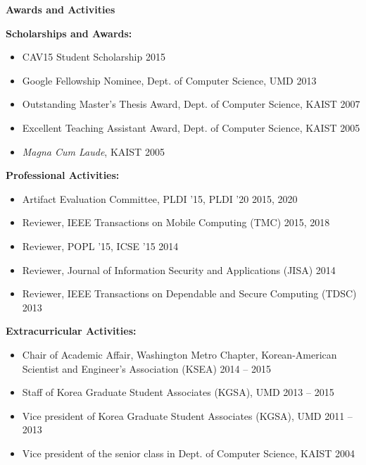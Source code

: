 \documentclass[letterpaper,11pt]{article}
\newcommand{\resheading}[1]{{\large \colorbox{mygrey}{\begin{minipage}{\textwidth}{\textbf{#1 \vphantom{p\^{E}}}}\end{minipage}}}}
\begin{document}

\resheading{Awards and Activities}
  \begin{description}
\item\textbf{Scholarships and Awards:}
\begin{itemize}
\item CAV15 Student Scholarship \hfill 2015
\item Google Fellowship Nominee, Dept. of Computer Science, UMD \hfill 2013 
\item Outstanding Master's Thesis Award, Dept. of Computer Science, KAIST \hfill 2007
\item Excellent Teaching Assistant Award, Dept. of Computer Science, KAIST \hfill 2005
\item \emph{Magna Cum Laude}, KAIST \hfill 2005
\end{itemize}
\item\textbf{Professional Activities:}
\begin{itemize}
\item Artifact Evaluation Committee, PLDI '15, PLDI '20 \hfill 2015, 2020
\item Reviewer, IEEE Transactions on Mobile Computing (TMC) \hfill 2015, 2018
\item Reviewer, POPL '15, ICSE '15 \hfill 2014
\item Reviewer, Journal of Information Security and Applications (JISA) \hfill 2014
\item Reviewer, IEEE Transactions on Dependable and Secure Computing (TDSC) \hfill 2013
\end{itemize}
\item\textbf{Extracurricular Activities:}
\begin{itemize}
\item Chair of Academic Affair, Washington Metro Chapter, Korean-American Scientist and Engineer's Association (KSEA) \hfill 2014 -- 2015
\item Staff of Korea Graduate Student Associates (KGSA), UMD \hfill 2013 -- 2015
\item Vice president of Korea Graduate Student Associates (KGSA), UMD \hfill 2011 -- 2013
\item Vice president of the senior class in Dept. of Computer Science, KAIST \hfill 2004
\end{itemize}
  \end{description} %
\end{document}
